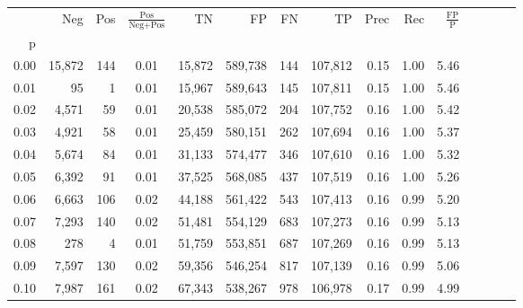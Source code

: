 \begin{tabular}{rrrcrrrrrrrrrrr}
\toprule
{} &     Neg &    Pos & $\frac{\text{Pos}}{\text{Neg}+\text{Pos}}$ &       TN &       FP &       FN &       TP &  Prec &   Rec & $\frac{\text{FP}}{\text{P}}$ \\
p    &         &        &                                            &          &          &          &          &       &       &                              \\
\midrule
0.00 &  15,872 &    144 &                                       0.01 &   15,872 &  589,738 &      144 &  107,812 &  0.15 &  1.00 &                         5.46 \\
0.01 &      95 &      1 &                                       0.01 &   15,967 &  589,643 &      145 &  107,811 &  0.15 &  1.00 &                         5.46 \\
0.02 &   4,571 &     59 &                                       0.01 &   20,538 &  585,072 &      204 &  107,752 &  0.16 &  1.00 &                         5.42 \\
0.03 &   4,921 &     58 &                                       0.01 &   25,459 &  580,151 &      262 &  107,694 &  0.16 &  1.00 &                         5.37 \\
0.04 &   5,674 &     84 &                                       0.01 &   31,133 &  574,477 &      346 &  107,610 &  0.16 &  1.00 &                         5.32 \\
0.05 &   6,392 &     91 &                                       0.01 &   37,525 &  568,085 &      437 &  107,519 &  0.16 &  1.00 &                         5.26 \\
0.06 &   6,663 &    106 &                                       0.02 &   44,188 &  561,422 &      543 &  107,413 &  0.16 &  0.99 &                         5.20 \\
0.07 &   7,293 &    140 &                                       0.02 &   51,481 &  554,129 &      683 &  107,273 &  0.16 &  0.99 &                         5.13 \\
0.08 &     278 &      4 &                                       0.01 &   51,759 &  553,851 &      687 &  107,269 &  0.16 &  0.99 &                         5.13 \\
0.09 &   7,597 &    130 &                                       0.02 &   59,356 &  546,254 &      817 &  107,139 &  0.16 &  0.99 &                         5.06 \\
0.10 &   7,987 &    161 &                                       0.02 &   67,343 &  538,267 &      978 &  106,978 &  0.17 &  0.99 &                         4.99 \\

\end{tabular}
